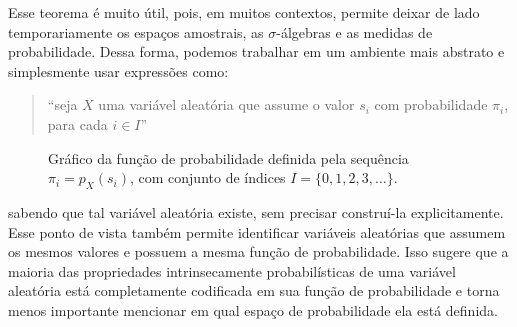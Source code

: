\documentclass[12pt,portuguese]{article}
\theoremstyle{definition}
\begin{document}
Esse teorema é muito útil, pois, em muitos contextos, permite deixar de lado
temporariamente os espaços amostrais, as \(\sigma\)-álgebras e as medidas de
probabilidade. Dessa forma, podemos trabalhar em um ambiente mais abstrato e
simplesmente usar expressões como:
\begin{quote}
``seja \(X\) uma variável aleatória que assume o valor \(s_i\)
com probabilidade \(\pi_i\), para cada \(i \in I\)''
\end{quote}
\begin{figure}[H]
\centering
{}
\caption{Gráfico da função de probabilidade definida pela sequência $\pi_i = p_X(s_i)$,
com conjunto de índices $I = \{0, 1, 2, 3, \dots\}$.}
\label{fig:hastes-massa}
\end{figure}
sabendo que tal variável aleatória existe, sem precisar construí-la explicitamente.
Esse ponto de vista também permite identificar variáveis aleatórias que assumem
os mesmos valores e possuem a mesma função de probabilidade. Isso sugere que a
maioria das propriedades intrinsecamente probabilísticas de uma variável
aleatória está completamente codificada em sua função de probabilidade e torna
menos importante mencionar em qual espaço de probabilidade ela está definida.
\end{document}
